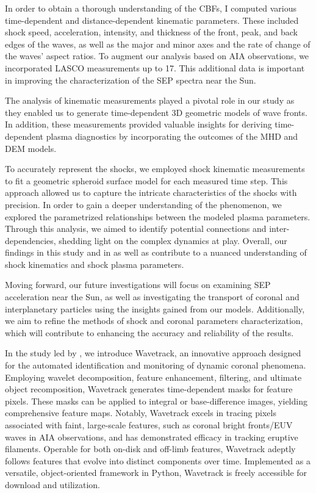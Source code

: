 In order to obtain a thorough understanding of the CBFs, I computed various time-dependent and distance-dependent kinematic parameters. These included shock speed, acceleration, intensity, and thickness of the front, peak, and back edges of the waves, as well as the major and minor axes and the rate of change of the waves' aspect ratios. To augment our analysis based on AIA observations, we incorporated LASCO measurements up to 17\rsun. This additional data is important in improving the characterization of the SEP spectra near the Sun.

The analysis of kinematic measurements played a pivotal role in our study as they enabled us to generate time-dependent 3D geometric models of wave fronts. In addition, these measurements provided valuable insights for deriving time-dependent plasma diagnostics by incorporating the outcomes of the MHD and DEM models.

To accurately represent the shocks, we employed shock kinematic measurements to fit a geometric spheroid surface model for each measured time step. This approach allowed us to capture the intricate characteristics of the shocks with precision.
In order to gain a deeper understanding of the phenomenon, we explored the parametrized relationships between the modeled plasma parameters. Through this analysis, we aimed to identify potential connections and inter-dependencies, shedding light on the complex dynamics at play.
Overall, our findings in this study and in \citet{kozarev_2022} as well as \citet{stepanyuk_2022} contribute to a nuanced understanding of shock kinematics and shock plasma parameters.

Moving forward, our future investigations will focus on examining SEP acceleration near the Sun, as well as investigating the transport of coronal and interplanetary particles using the insights gained from our models. Additionally, we aim to refine the methods of shock and coronal parameters characterization, which will contribute to enhancing the accuracy and reliability of the results.

In the study led by \citet{stepanyuk_2022}, we introduce Wavetrack, an innovative approach designed for the automated identification and monitoring of dynamic coronal phenomena. Employing wavelet decomposition, feature enhancement, filtering, and ultimate object recomposition, Wavetrack generates time-dependent masks for feature pixels. These masks can be applied to integral or base-difference images, yielding comprehensive feature maps. Notably, Wavetrack excels in tracing pixels associated with faint, large-scale features, such as coronal bright fronts/EUV waves in AIA observations, and has demonstrated efficacy in tracking eruptive filaments.
Operable for both on-disk and off-limb features, Wavetrack adeptly follows features that evolve into distinct components over time. Implemented as a versatile, object-oriented framework in Python, Wavetrack is freely accessible for download and utilization.

